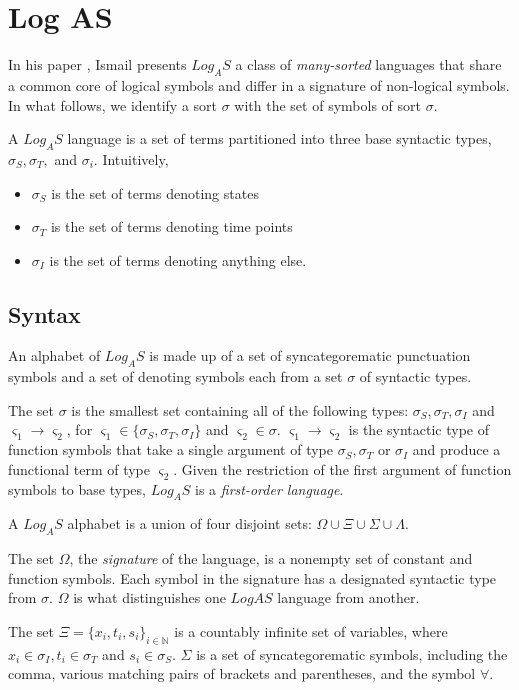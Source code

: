 \chapter{Log AS}

In his paper \cite{ismail2013stability}, Ismail presents
$Log_AS$ a class of \textit{many-sorted} languages that share a common core of logical symbols and differ in a signature of non-logical symbols. In what follows, we identify a sort $\sigma$ with
the set of symbols of sort $\sigma$.

A $Log_AS$ language is a set of terms partitioned into three base syntactic types, $\sigma_S , \sigma_T ,$
and $\sigma_i$. Intuitively,
\begin{itemize}
  \item $\sigma_S$ is the set of terms denoting states
  \item $\sigma_T$ is the set of terms denoting time points
  \item $\sigma_I$ is the set of terms denoting anything else.
\end{itemize}

\section{Syntax}
An alphabet of $Log_A S$ is made up of a set of syncategorematic punctuation symbols and a set of denoting symbols each from a set $\sigma$ of syntactic types.

The set $\sigma$ is the smallest set containing all of the following types:
$\sigma_S, \sigma_T, \sigma_I$ and $\varsigma_1 \to \varsigma_2$,
for $\varsigma_1 \in \{\sigma_S, \sigma_T, \sigma_I \}$ and $\varsigma_2 \in \sigma$.
$\varsigma_1 \to \varsigma_2$ is the syntactic type of function symbols that take a single
argument of type $\sigma_S, \sigma_T$ or $\sigma_I$ and produce a functional
term of type $\varsigma_2$.
Given the restriction of the first argument of function symbols to base types, $Log_A S$ is a \textit{first-order language}.


A $Log_A S$ alphabet is a union of four disjoint sets:
$ \Omega \cup \Xi \cup \Sigma \cup \Lambda$.

The set $\Omega$, the \textit{signature} of the language, is a nonempty set of constant and function symbols. Each symbol in the signature has a designated syntactic type from $\sigma$. $\Omega$  is
what distinguishes one $LogA S$ language from another.

The set $\Xi = \{x_i, t_i, s_i\}_{i \in \mathbb{N}}$ is a countably infinite set of variables, where$x_i \in \sigma_I, t_i \in \sigma_T$ and $s_i \in \sigma_S$. $\Sigma$ is a set
of syncategorematic symbols, including the comma, various
matching pairs of brackets and parentheses, and the symbol $\forall$.

